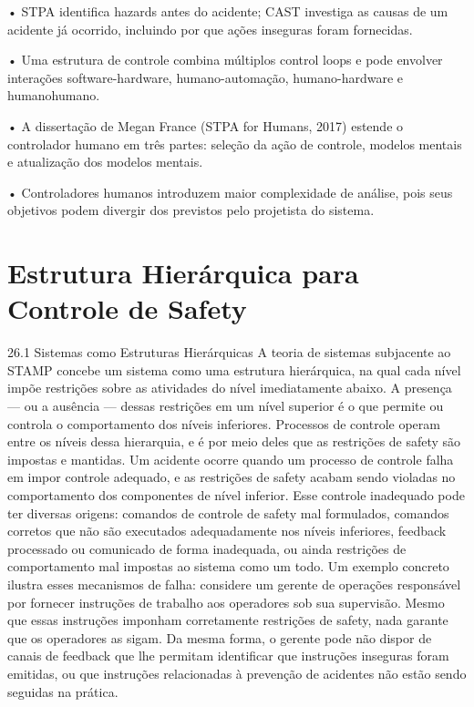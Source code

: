 • STPA identifica hazards antes do acidente; CAST investiga as causas de um acidente já ocorrido, incluindo por que ações inseguras foram fornecidas.

• Uma estrutura de controle combina múltiplos control loops e pode envolver interações software-hardware, humano-automação, humano-hardware e humanohumano.

• A dissertação de Megan France (STPA for Humans, 2017) estende o controlador humano em três partes: seleção da ação de controle, modelos mentais e atualização dos modelos mentais.

• Controladores humanos introduzem maior complexidade de análise, pois seus objetivos podem divergir dos previstos pelo projetista do sistema.

\chapter{Estrutura Hierárquica para Controle de Safety}

26.1 Sistemas como Estruturas Hierárquicas A teoria de sistemas subjacente ao STAMP concebe um sistema como uma estrutura hierárquica, na qual cada nível impõe restrições sobre as atividades do nível imediatamente abaixo. A presença — ou a ausência — dessas restrições em um nível superior é o que permite ou controla o comportamento dos níveis inferiores. Processos de controle operam entre os níveis dessa hierarquia, e é por meio deles que as restrições de safety são impostas e mantidas. Um acidente ocorre quando um processo de controle falha em impor controle adequado, e as restrições de safety acabam sendo violadas no comportamento dos componentes de nível inferior. Esse controle inadequado pode ter diversas origens: comandos de controle de safety mal formulados, comandos corretos que não são executados adequadamente nos níveis inferiores, feedback processado ou comunicado de forma inadequada, ou ainda restrições de comportamento mal impostas ao sistema como um todo. Um exemplo concreto ilustra esses mecanismos de falha: considere um gerente de operações responsável por fornecer instruções de trabalho aos operadores sob sua supervisão. Mesmo que essas instruções imponham corretamente restrições de safety, nada garante que os operadores as sigam. Da mesma forma, o gerente pode não dispor de canais de feedback que lhe permitam identificar que instruções inseguras foram emitidas, ou que instruções relacionadas à prevenção de acidentes não estão sendo seguidas na prática.

